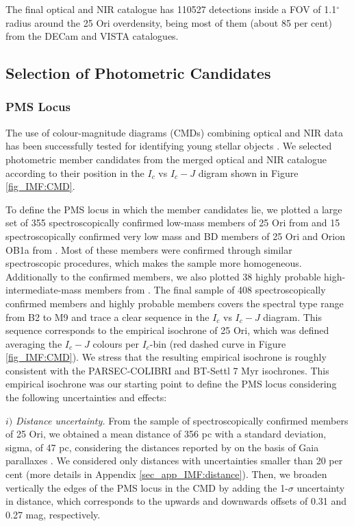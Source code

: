 \documentclass[12pt]{article}
\begin{document}
The final optical and NIR catalogue has 110527 detections inside a FOV of 1.1$^\circ$ radius around the 25 Ori overdensity, being most of them (about 85 per cent) from the DECam and VISTA catalogues.

\subsection{Selection of Photometric Candidates}
\label{sec_IMF:candidates}

\subsubsection{PMS Locus}
\label{sec_IMF:locus}
The use of colour-magnitude diagrams (\ac{CMD}s) combining optical and NIR data has been successfully tested for identifying young stellar objects \citep[e.g. ][ and references therein]{Downes2014}. We selected photometric member candidates from the merged optical and NIR catalogue according to their position in the $I_c$ vs $I_c-J$ digram shown in Figure \ref{fig_IMF:CMD}.

To define the PMS locus in which the member candidates lie, we plotted a large set of 355 spectroscopically confirmed low-mass members of 25 Ori from \cite{Briceno2005,Briceno2007,Downes2014,Suarez2017,Briceno2018} and 15 spectroscopically confirmed very low mass and BD members of 25 Ori and Orion OB1a from \citet{Downes2015}. Most of these members were confirmed through similar spectroscopic procedures, which makes the sample more homogeneous. Additionally to the confirmed members, we also plotted 38 highly probable high-intermediate-mass members from \cite{Kharchenko2005}. The final sample of 408 spectroscopically confirmed members and highly probable members covers the spectral type range from B2 to M9 and trace a clear sequence in the $I_c$ vs $I_c-J$ diagram. This sequence corresponds to the empirical isochrone of 25 Ori, which was defined averaging the $I_c-J$ colours per $I_c$-bin (red dashed curve in Figure \ref{fig_IMF:CMD}). We stress that the resulting empirical isochrone is roughly consistent with the PARSEC-COLIBRI and BT-Settl 7 Myr isochrones. This empirical isochrone was our starting point to define the PMS locus considering the following uncertainties and effects:

$i)$ \emph{Distance uncertainty.} From the sample of spectroscopically confirmed members of 25 Ori, we obtained a mean distance of 356 pc with a standard deviation, \ac{sigma}, of 47 pc, considering the distances reported by \citet[\ac{BJ18}; ][]{Bailer-Jones2018} on the basis of Gaia parallaxes \citep[\ac{Gaia DR2}; ][]{GaiaCollaboration2018}. We considered only distances with uncertainties smaller than 20 per cent (more details in Appendix \ref{sec_app_IMF:distance}). Then, we broaden vertically the edges of the PMS locus in the CMD by adding the 1-$\sigma$ uncertainty in distance, which corresponds to the upwards and downwards offsets of 0.31 and 0.27 mag, respectively.
\end{document}
